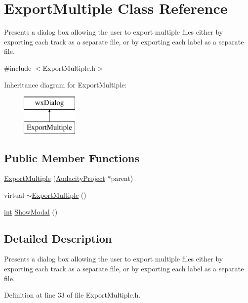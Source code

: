 \hypertarget{class_export_multiple}{}\section{Export\+Multiple Class Reference}
\label{class_export_multiple}


Presents a dialog box allowing the user to export multiple files either by exporting each track as a separate file, or by exporting each label as a separate file.  




{\ttfamily \#include $<$Export\+Multiple.\+h$>$}

Inheritance diagram for Export\+Multiple\+:\begin{figure}[H]
\begin{center}
\leavevmode
\includegraphics[height=2.000000cm]{class_export_multiple}
\end{center}
\end{figure}
\subsection*{Public Member Functions}
\begin{DoxyCompactItemize}
\item 
\hyperlink{class_export_multiple_af5625cee637df99b86d453682edb62f6}{Export\+Multiple} (\hyperlink{class_audacity_project}{Audacity\+Project} $\ast$parent)
\item 
virtual \hyperlink{class_export_multiple_a5f36e7702674a229aac48d2785831f65}{$\sim$\+Export\+Multiple} ()
\item 
\hyperlink{xmltok_8h_a5a0d4a5641ce434f1d23533f2b2e6653}{int} \hyperlink{class_export_multiple_acba3d4719ac1d824722b270ac4373319}{Show\+Modal} ()
\end{DoxyCompactItemize}


\subsection{Detailed Description}
Presents a dialog box allowing the user to export multiple files either by exporting each track as a separate file, or by exporting each label as a separate file. 

Definition at line 33 of file Export\+Multiple.\+h.



